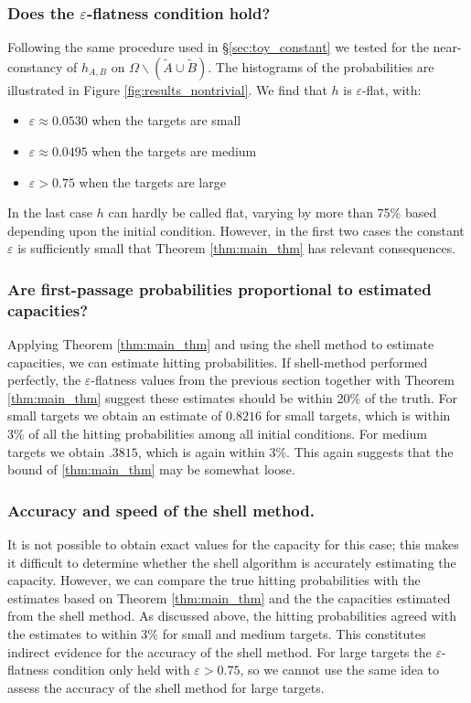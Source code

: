 \documentclass[12pt, nofootinbib,english, amsmath, amssymb, aps, priprint, graphicx,floatfix,draft]{revtex4-1}
\theoremstyle{plain}
\theoremstyle{definition}
\theoremstyle{plain}
\newcommand{\tA}{{\tilde A}}
\newcommand{\tB}{{\tilde B}}
\begin{document}
\subsubsection{Does the $\varepsilon$-flatness condition hold?}
Following the same procedure used in \S\ref{sec:toy_constant} we tested for the near-constancy of $h_{A,B}$ on $\Omega\backslash(\tA\cup\tB)$. The histograms of the probabilities are illustrated in Figure \ref{fig:results_nontrivial}. We find that $h$ is $\varepsilon$-flat, with:
\begin{itemize}
    \item $\varepsilon\approx 0.0530$ when the targets are small
    \item $\varepsilon\approx 0.0495$ when the targets are medium
    \item $\varepsilon> 0.75$ when the targets are large
\end{itemize}
In the last case $h$ can hardly be called flat, varying by more than 75\% based depending upon the initial condition.  However, in the first two cases the constant $\varepsilon$ is sufficiently small that Theorem \ref{thm:main_thm} has relevant consequences.

\subsubsection{Are first-passage probabilities proportional to estimated capacities?}
Applying Theorem \ref{thm:main_thm} and using the shell method to estimate capacities, we can estimate hitting probabilities.  If shell-method performed perfectly, the $\varepsilon$-flatness values from the previous section together with Theorem \ref{thm:main_thm} suggest these estimates should be within 20\% of the truth.  For small targets we obtain an estimate of $0.8216$ for small targets, which is within 3\% of all the hitting probabilities among all initial conditions.  For medium targets we obtain $.3815$, which is again within 3\%.  This again suggests that the bound of \ref{thm:main_thm} may be somewhat loose.

\subsubsection{Accuracy and speed of the shell method.}

It is not possible to obtain exact values for the capacity for this case; this makes it difficult to determine whether the shell algorithm is accurately estimating the capacity.  However, we can compare the true hitting probabilities with the estimates based on Theorem \ref{thm:main_thm} and the the capacities estimated from the shell method.  As discussed above, the hitting probabilities agreed with the estimates to within 3\% for small and medium targets.  This constitutes indirect evidence for the accuracy of the shell method.  For large targets the $\varepsilon$-flatness condition only held with $\varepsilon>0.75$, so we cannot use the same idea to assess the accuracy of the shell method for large targets. 
\end{document}
